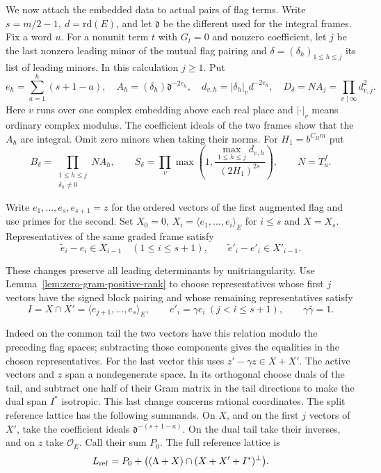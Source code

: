 

We now attach the embedded data to actual pairs of flag terms.
Write \(s=m/2-1,\ d=\mathrm{rd}(E)\), and let \(\mathfrak d\)
be the different used for the integral frames. Fix a word \(u\).
For a nonunit term \(t\) with \(G_t=0\) and nonzero coefficient, let \(j\) be the last
nonzero leading minor of the mutual flag pairing and
\(\delta=(\delta_h)_{1\le h\le j}\) its list of leading minors.
In this calculation \(j\ge1\). Put
\[
 e_h=\sum_{a=1}^h(s+1-a),\quad
 A_h=(\delta_h)\mathfrak d^{-2e_h},\quad
 d_{v,h}=|\delta_h|_v d^{-2e_h},\quad
 D_\delta=N A_j=\prod_{v\mid\infty}d_{v,j}^2 .
\]
Here \(v\) runs over one complex embedding above each real place
and \(|\cdot|_v\) means ordinary complex modulus. The coefficient
ideals of the two frames show that the \(A_h\) are integral.
Omit zero minors when taking their norms. For \(H_1=b^{C_Hm}\) put
\[
 B_\delta=\prod_{\substack{1\le h\le j\\\delta_h\ne0}}N A_h,\qquad
 S_\delta=\prod_v\max\left(1,\frac{\max_{1\le h\le j}d_{v,h}}
                                      {(2H_1)^{2s}}\right),\qquad N=T_u^f .
\]

Write \(e_1,\ldots,e_s,e_{s+1}=z\) for the ordered vectors
of the first augmented flag and use primes for the second. Set
\(X_0=0\), \(X_i=\langle e_1,\ldots,e_i\rangle_E\) for \(i\le s\)
and \(X=X_s\). Representatives of the same graded frame satisfy
\[
 \widetilde e_i-e_i\in X_{i-1}\quad(1\le i\le s+1),
 \qquad \widetilde e'_i-e'_i\in X'_{i-1}.
\]

These changes preserve all leading determinants by unitriangularity.
Use Lemma~\ref{lem:zero-gram-positive-rank} to choose representatives
whose first \(j\) vectors have the signed block pairing and whose
remaining representatives satisfy
\[
 I=X\cap X'=\langle e_{j+1},\ldots,e_s\rangle_E,\qquad
 e'_i=\gamma e_i\ (j<i\le s+1),\qquad\gamma\bar\gamma=1.
\]

Indeed on the common tail the two vectors have this relation
modulo the preceding flag spaces; subtracting those components
gives the equalities in the chosen representatives. For the last
vector this uses \(z'-\gamma z\in X+X'\). The active vectors
and \(z\) span a nondegenerate space. In its orthogonal choose
duals of the tail, and subtract one half of their Gram matrix
in the tail directions to make the dual span \(I^*\) isotropic.
This last change concerns rational coordinates. The split reference lattice has the following summands. On
\(X\), and on the first \(j\) vectors of \(X'\), take the
coefficient ideals \(\mathfrak d^{-(s+1-a)}\). On the dual tail
take their inverses, and on \(z\) take \(\mathcal O_E\).
Call their sum \(P_0\). The full reference lattice is
\[
 L_{\rm ref}=P_0+
 \bigl((\Lambda+X)\cap(X+X'+I^*)^\perp\bigr).
\]

